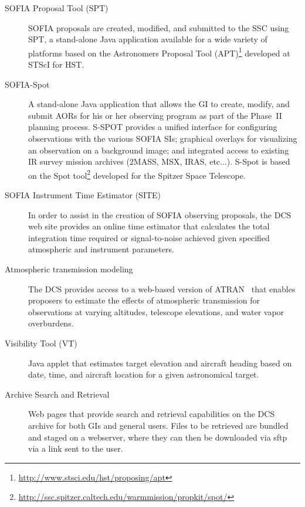 \documentclass[11pt,twoside]{article}
\begin{document}
\begin{description}

\item[SOFIA Proposal Tool (SPT)] SOFIA proposals are created, modified, and submitted to the SSC using SPT, a stand-alone Java application available for a wide variety of platforms based on the Astronomers Proposal Tool (APT)\footnote{
\url{http://www.stsci.edu/hst/proposing/apt}}
 developed at STScI for HST.


\item[SOFIA-Spot] A stand-alone Java application that allows the GI to create, modify, and submit AORs for his or her observing program as part of the Phase~II planning process. S-SPOT provides a unified interface for configuring observations with the various SOFIA SIs; graphical overlays for visualizing an observation on a background image; and integrated access to existing IR survey mission archives (2MASS, MSX, IRAS, etc...).  S-Spot is based on the Spot tool\footnote{
\url{http://ssc.spitzer.caltech.edu/warmmission/propkit/spot/}}
developed for the Spitzer Space Telescope.

\item[SOFIA Instrument Time Estimator (SITE)] In order to assist in the creation of SOFIA observing proposals, the DCS web site provides an online time estimator that calculates the total integration time required or signal-to-noise achieved given specified atmospheric and instrument parameters. 

\item[Atmospheric transmission modeling] The DCS provides access to a web-based version of ATRAN~\citep{Lord:1992} that enables proposers to estimate the effects of atmospheric transmission for observations at varying altitudes, telescope elevations,  and water vapor overburdens.  

\item[Visibility Tool (VT)] Java applet that estimates target elevation and aircraft heading based on date, time, and aircraft location for a given astronomical target.  

\item[Archive Search and Retrieval] Web pages that provide search and retrieval capabilities on the DCS archive for both GIs and general users.  Files to be retrieved are bundled and staged on a webserver, where they can then be downloaded via sftp via a link sent to the user.

\end{description}
\end{document}

